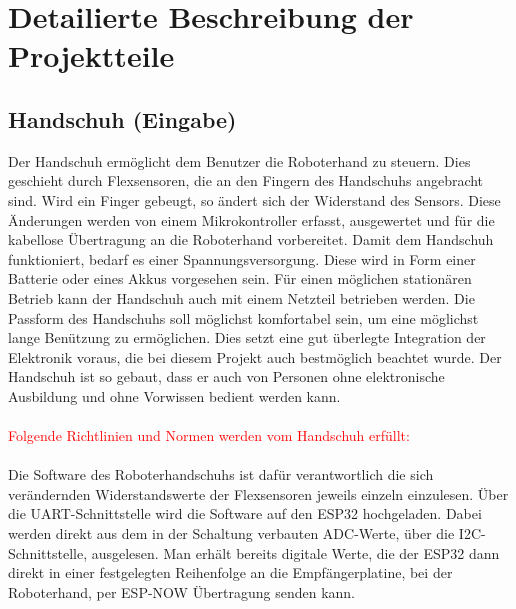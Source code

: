 \documentclass[11pt]{article}
\begin{document}

\section{Detailierte Beschreibung der Projektteile}

\subsection{Handschuh (Eingabe)}
Der Handschuh ermöglicht dem Benutzer die Roboterhand zu steuern. 
Dies geschieht durch Flexsensoren, die an den Fingern des Handschuhs angebracht sind. Wird ein Finger gebeugt, 
so ändert sich der Widerstand des Sensors. Diese Änderungen werden von einem Mikrokontroller erfasst, ausgewertet 
und für die kabellose Übertragung an die Roboterhand vorbereitet. Damit dem Handschuh funktioniert, bedarf es 
einer Spannungsversorgung. Diese wird in Form einer Batterie oder eines Akkus vorgesehen sein. Für einen möglichen 
stationären Betrieb kann der Handschuh auch mit einem Netzteil betrieben werden. Die Passform des Handschuhs soll 
möglichst komfortabel sein, um eine möglichst lange Benützung zu ermöglichen. Dies setzt eine gut überlegte Integration 
der Elektronik voraus, die bei diesem Projekt auch bestmöglich beachtet wurde. Der Handschuh ist so gebaut, dass er 
auch von Personen ohne elektronische Ausbildung und ohne Vorwissen bedient werden kann.\\
\\
\textcolor{red}{Folgende Richtlinien und Normen werden vom Handschuh erfüllt:}\\
\\
Die Software des Roboterhandschuhs ist dafür verantwortlich die sich verändernden Widerstandswerte der Flexsensoren 
jeweils einzeln einzulesen. Über die UART-Schnittstelle wird die Software auf den ESP32 hochgeladen. Dabei werden 
direkt aus dem in der Schaltung verbauten ADC-Werte, über die I2C-Schnittstelle, ausgelesen. Man erhält bereits digitale 
Werte, die der ESP32 dann direkt in einer festgelegten Reihenfolge an die Empfängerplatine, bei der Roboterhand, per 
ESP-NOW Übertragung senden kann.
\end{document}
